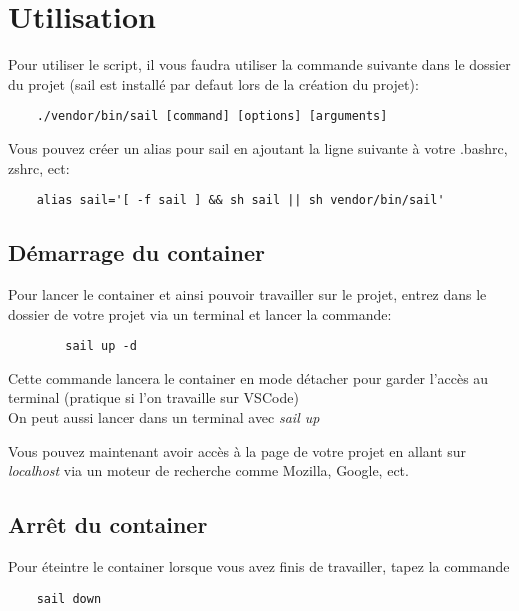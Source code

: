 \section[Utilisation]{Utilisation\label{sec:utilisation}}

Pour utiliser le script, il vous faudra utiliser la commande suivante dans le dossier du projet (sail est installé par defaut lors de la création du projet):

\begin{lstlisting}
    ./vendor/bin/sail [command] [options] [arguments]
\end{lstlisting}

Vous pouvez créer un alias pour sail en ajoutant la ligne suivante à votre .bashrc, zshrc, ect: 

\begin{lstlisting}
    alias sail='[ -f sail ] && sh sail || sh vendor/bin/sail'
\end{lstlisting}

\subsection[Démarrage du container]{Démarrage du container}
    Pour lancer le container et ainsi pouvoir travailler sur le projet, entrez dans le dossier de votre projet via un terminal et lancer la commande:
    
    \begin{lstlisting}
        sail up -d
    \end{lstlisting}

    Cette commande lancera le container en mode détacher pour garder l'accès au terminal (pratique si l'on travaille sur VSCode)\\
    \footnotesize{On peut aussi lancer dans un terminal avec \textit{sail up}}


    Vous pouvez maintenant avoir accès à la page de votre projet en allant sur \textit{localhost} via un moteur de recherche comme Mozilla, Google, ect.

\subsection{Arrêt du container}

Pour éteintre le container lorsque vous avez finis de travailler, tapez la commande

\begin{lstlisting}
    sail down
\end{lstlisting}